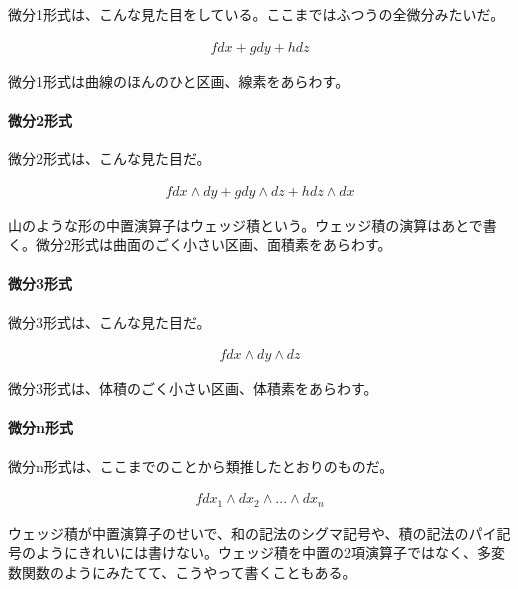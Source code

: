 微分1形式は、こんな見た目をしている。ここまではふつうの全微分みたいだ。

\begin{equation*}
\begin{split}
f dx + g dy + h dz
\end{split}
\end{equation*}

微分1形式は曲線のほんのひと区画、線素をあらわす。

\paragraph{微分2形式}

微分2形式は、こんな見た目だ。

\begin{equation*}
\begin{split}
f dx \wedge dy + g dy \wedge dz + h dz \wedge dx
\end{split}
\end{equation*}

山のような形の中置演算子はウェッジ積という。ウェッジ積の演算はあとで書く。微分2形式は曲面のごく小さい区画、面積素をあらわす。

\paragraph{微分3形式}

微分3形式は、こんな見た目だ。

\begin{equation*}
\begin{split}
f dx \wedge dy \wedge dz
\end{split}
\end{equation*}

微分3形式は、体積のごく小さい区画、体積素をあらわす。

\paragraph{微分n形式}

微分n形式は、ここまでのことから類推したとおりのものだ。

\begin{equation*}
\begin{split}
f dx_1 \wedge dx_2 \wedge ... \wedge dx_n
\end{split}
\end{equation*}

ウェッジ積が中置演算子のせいで、和の記法のシグマ記号や、積の記法のパイ記号のようにきれいには書けない。ウェッジ積を中置の2項演算子ではなく、多変数関数のようにみたてて、こうやって書くこともある。

